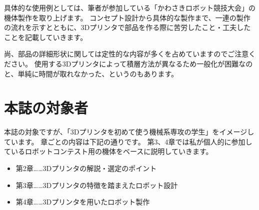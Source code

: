 具体的な使用例としては、筆者が参加している「かわさきロボット競技大会」の機体製作を取り上げます。
コンセプト設計から具体的な製作まで、一連の製作の流れを示すとともに、3Dプリンタで部品を作る際に苦労したこと・工夫したことを記載していきます。

尚、部品の詳細形状に関しては定性的な内容が多くを占めていますのでご注意ください。
使用する3Dプリンタによって積層方法が異なるため一般化が困難なのと、単純に時間が取れなかった、というのもあります。

\section{本誌の対象者}\label{ux672cux8a8cux306eux5bfeux8c61ux8005}

本誌の対象ですが、「3Dプリンタを初めて使う機械系専攻の学生」をイメージしています。
章ごとの内容は下記の通りです。
第3、4章では私が個人的に参加しているロボットコンテスト用の機体をベースに説明していきます。

\begin{itemize}
\tightlist
\item
  第2章\ldots{}\ldots{}3Dプリンタの解説・選定のポイント
\item
  第3章\ldots{}\ldots{}3Dプリンタの特徴を踏まえたロボット設計
\item
  第4章\ldots{}\ldots{}3Dプリンタを用いたロボット製作
\end{itemize}
